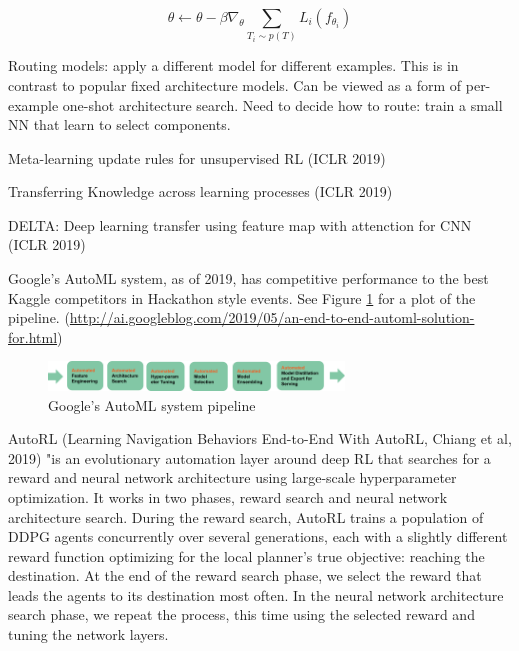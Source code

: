 \documentclass[english]{article}
\begin{document}
$$\theta  \gets 
\theta - \beta \nabla_\theta \sum_{T_i \sim p(T)} L_i(f_{\theta_i})
$$

\item Routing models: apply a different model for different examples. This is in contrast to popular fixed architecture models. Can be viewed as a form of per-example one-shot architecture search. Need to decide how to route: train a small NN that learn to select components. 

\item Meta-learning update rules for unsupervised RL (ICLR 2019)

Transferring Knowledge across learning processes (ICLR 2019)

DELTA: Deep learning transfer using feature map with attenction for CNN (ICLR 2019)

\item Google's AutoML system, as of 2019, has competitive performance to the best Kaggle competitors in Hackathon style events. See Figure \ref{automl} for a plot of the pipeline. (\url{http://ai.googleblog.com/2019/05/an-end-to-end-automl-solution-for.html})


\begin{figure}[h!]
  \centering
  \includegraphics[width=0.7\textwidth]{automl}
  \caption{Google's AutoML system pipeline}
  \label{automl}
\end{figure}

\item AutoRL (Learning Navigation Behaviors End-to-End With AutoRL, Chiang et al, 2019)
"is an evolutionary automation layer around deep RL that searches for a reward and neural network architecture using large-scale hyperparameter optimization. It works in two phases, reward search and neural network architecture search. During the reward search, AutoRL trains a population of DDPG agents concurrently over several generations, each with a slightly different reward function optimizing for the local planner’s true objective: reaching the destination. At the end of the reward search phase, we select the reward that leads the agents to its destination most often. In the neural network architecture search phase, we repeat the process, this time using the selected reward and tuning the network layers.

\eenum 
\end{document}
